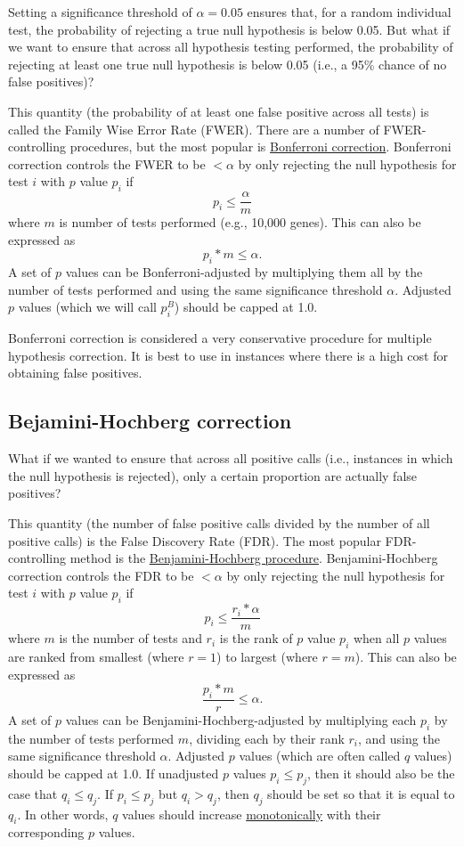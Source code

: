 \documentclass[letterpaper, 12pt]{article}
\begin{document}
Setting a significance threshold of $\alpha = 0.05$
ensures that, for a random individual test, the probability of rejecting a true null hypothesis is below 0.05. But what if we want to ensure that across all hypothesis testing performed, the probability of rejecting at least one true null hypothesis is below 0.05 (i.e., a 95\% chance of no false positives)?

This quantity (the probability of at least one false positive across all tests) is called the Family Wise Error Rate (FWER). There are a number of FWER-controlling procedures, but the most popular is \href{https://en.wikipedia.org/wiki/Bonferroni_correction}{Bonferroni correction}. Bonferroni correction controls the FWER to be $< \alpha$ by only rejecting the null hypothesis for test $i$ with $p$ value $p_i$ if
$$p_i \leq \frac{\alpha}{m}$$
where $m$ is number of tests performed (e.g., 10,000 genes). This can also be expressed as
$$p_i * m \leq \alpha.$$
A set of $p$ values can be Bonferroni-adjusted by multiplying them all by the number of tests performed and using the same significance threshold $\alpha$. Adjusted $p$ values (which we will call $p_i^{B}$) should be capped at 1.0.

Bonferroni correction is considered a very conservative procedure for multiple hypothesis correction. It is best to use in instances where there is a high cost for obtaining false positives.

\subsection*{Bejamini-Hochberg correction}

What if we wanted to ensure that across all positive calls (i.e., instances in which the null hypothesis is rejected), only a certain proportion are actually false positives?

This quantity (the number of false positive calls divided by the number of all positive calls) is the False Discovery Rate (FDR). The most popular FDR-controlling method is the \href{https://doi.org/10.1111/j.2517-6161.1995.tb02031.x}{Benjamini-Hochberg procedure}. Benjamini-Hochberg correction controls the FDR to be $< \alpha$ by only rejecting the null hypothesis for test $i$ with $p$ value $p_i$ if
$$p_i \leq \frac{r_i * \alpha}{m}$$
where $m$ is the number of tests and $r_i$ is the rank of $p$ value $p_i$ when all $p$ values are ranked from smallest (where $r = 1$) to largest (where $r = m$). This can also be expressed as
$$\frac{p_i * m}{r} \leq \alpha.$$
A set of $p$ values can be Benjamini-Hochberg-adjusted by multiplying each $p_i$ by the number of tests performed $m$, dividing each by their rank $r_i$, and using the same significance threshold $\alpha$. Adjusted $p$ values (which are often called $q$ values) should be capped at 1.0. If unadjusted $p$ values $p_i \leq p_j$, then it should also be the case that $q_i \leq q_j$. If $p_i \leq p_j$ but $q_i > q_j$, then $q_j$ should be set so that it is equal to $q_i$. In other words, $q$ values should increase \href{https://en.wikipedia.org/wiki/Monotonic_function}{monotonically} with their corresponding $p$ values.
\end{document}
